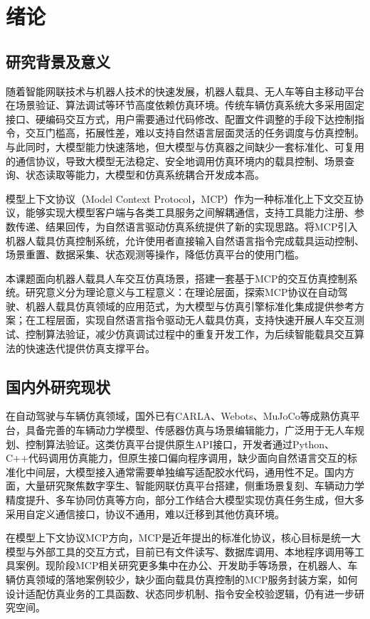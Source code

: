 \chapter{绪论}

\section{研究背景及意义}
随着智能网联技术与机器人技术的快速发展，机器人载具、无人车等自主移动平台在场景验证、算法调试等环节高度依赖仿真环境。传统车辆仿真系统大多采用固定接口、硬编码交互方式，用户需要通过代码修改、配置文件调整的手段下达控制指令，交互门槛高，拓展性差，难以支持自然语言层面灵活的任务调度与仿真控制。与此同时，大模型能力快速落地，但大模型与仿真器之间缺少一套标准化、可复用的通信协议，导致大模型无法稳定、安全地调用仿真环境内的载具控制、场景查询、状态读取等能力，大模型和仿真系统耦合开发成本高。

模型上下文协议（Model Context Protocol，MCP）作为一种标准化上下文交互协议，能够实现大模型客户端与各类工具服务之间解耦通信，支持工具能力注册、参数传递、结果回传，为自然语言驱动仿真系统提供了新的实现思路。将MCP引入机器人载具仿真控制系统，允许使用者直接输入自然语言指令完成载具运动控制、场景重置、数据采集、状态观测等操作，降低仿真平台的使用门槛。

本课题面向机器人载具人车交互仿真场景，搭建一套基于MCP的交互仿真控制系统。研究意义分为理论意义与工程意义：在理论层面，探索MCP协议在自动驾驶、机器人载具仿真领域的应用范式，为大模型与仿真引擎标准化集成提供参考方案；在工程层面，实现自然语言指令驱动无人载具仿真，支持快速开展人车交互测试、控制算法验证，减少仿真调试过程中的重复开发工作，为后续智能载具交互算法的快速迭代提供仿真支撑平台。

\section{国内外研究现状}
在自动驾驶与车辆仿真领域，国外已有CARLA、Webots、MuJoCo等成熟仿真平台，具备完善的车辆动力学模型、传感器仿真与场景编辑能力，广泛用于无人车规划、控制算法验证。这类仿真平台提供原生API接口，开发者通过Python、C++代码调用仿真能力，但原生接口偏向程序调用，缺少面向自然语言交互的标准化中间层，大模型接入通常需要单独编写适配胶水代码，通用性不足。国内方面，大量研究聚焦数字孪生、智能网联仿真平台搭建，侧重场景复刻、车辆动力学精度提升、多车协同仿真等方向，部分工作结合大模型实现仿真任务生成，但大多采用自定义通信接口，协议不通用，难以迁移到其他仿真环境。

在模型上下文协议MCP方向，MCP是近年提出的标准化协议，核心目标是统一大模型与外部工具的交互方式，目前已有文件读写、数据库调用、本地程序调用等工具案例。现阶段MCP相关研究更多集中在办公、开发助手等场景，在机器人、车辆仿真领域的落地案例较少，缺少面向载具仿真控制的MCP服务封装方案，如何设计适配仿真业务的工具函数、状态同步机制、指令安全校验逻辑，仍有进一步研究空间。

